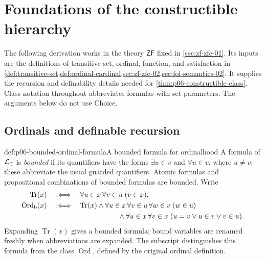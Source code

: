 \section{Foundations of the constructible hierarchy}
\label{sec:p06-constructible-hierarchy-foundations}

The following derivation works in the theory \(\mathsf{ZF}\) fixed in
\cref{sec:zf-zfc-01}.  Its inputs are the definitions of transitive set,
ordinal, function, and satisfaction in
\cref{def:transitive-set,def:ordinal-cardinal,sec:zf-zfc-02,sec:fol-semantics-02}.
It supplies the recursion and definability details needed for
\cref{thm:p06-constructible-class}.  Class notation throughout abbreviates
formulas with set parameters.  The arguments below do not use Choice.

\subsection{Ordinals and definable recursion}

\begin{hbdefinition}{def:p06-bounded-ordinal-formula}{A bounded formula for ordinalhood}
A formula of \(\mathcal{L}_{\in}\) is \emph{bounded} if its quantifiers have
the forms \(\exists u\in v\) and \(\forall u\in v\), where \(u\ne v\);
these abbreviate the usual guarded quantifiers.  Atomic formulas and
propositional combinations of bounded formulas are bounded.  Write
\[
\begin{aligned}
 \operatorname{Tr}(x)&\quad:\Longleftrightarrow\quad
       \forall u\in x\,\forall v\in u\;(v\in x),\\
 \operatorname{Ord}_{\mathrm b}(x)&\quad:\Longleftrightarrow\quad
       \operatorname{Tr}(x)
       \land\forall u\in x\,\forall v\in u\,\forall w\in v\;(w\in u)\\
       &\hspace{35mm}\land
       \forall u\in x\,\forall v\in x\;
                (u=v\lor u\in v\lor v\in u).
\end{aligned}
\]
Expanding \(\operatorname{Tr}(x)\) gives a bounded formula; bound
variables are renamed freshly when abbreviations are expanded.
The subscript distinguishes this formula from the class
\(\operatorname{Ord}\), defined by the original ordinal definition.
\end{hbdefinition}

